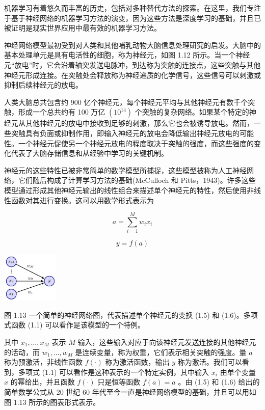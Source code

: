 \documentclass[10pt]{report}
\begin{document}
机器学习有着悠久而丰富的历史，包括对多种替代方法的探索。在这里，我们专注于基于神经网络的机器学习方法的演变，因为这些方法是深度学习的基础，并且已被证明是现实世界应用中最有效的机器学习方法。

神经网络模型最初受到对人类和其他哺乳动物大脑信息处理研究的启发。大脑中的基本处理单元是具有电活性的细胞，称为神经元，如图 1.12 所示。当一个神经元“放电”时，它会沿着轴突发送电脉冲，到达称为突触的连接点，这些突触与其他神经元形成连接。在突触处会释放称为神经递质的化学信号，这些信号可以刺激或抑制后续神经元的放电。

人类大脑总共包含约 900 亿个神经元，每个神经元平均与其他神经元有数千个突触，形成一个总共约有 100 万亿 \(\left( {10}^{14}\right)\) 个突触的复杂网络。如果某个特定的神经元从其他神经元的放电中接收到足够的刺激，那么它也会被诱导放电。然而，一些突触具有负面或抑制作用，即输入神经元的放电会降低输出神经元放电的可能性。一个神经元促使另一个神经元放电的程度取决于突触的强度，而这些强度的变化代表了大脑存储信息和从经验中学习的关键机制。

神经元的这些特性已被非常简单的数学模型所捕捉，这些模型被称为人工神经网络，它们随后构成了计算学习方法的基础(McCulloch 和 Pitts，1943)。许多这些模型通过形成其他神经元输出的线性组合来描述单个神经元的特性，然后使用非线性函数对其进行变换。这可以用数学形式表示为

\[
a = \mathop{\sum }\limits_{{i = 1}}^{M}{w}_{i}{x}_{i} \tag{1.5}
\]

\[
y = f\left( a\right)  \tag{1.6}
\]

\begin{center}
\includegraphics[max width=0.2\textwidth]{images/0194e279-9b28-703a-88f4-c3ac21e2010d_36_1225_345_326_291_0.jpg}
\end{center}
\hspace*{3em} 

图 1.13 一个简单的神经网络图，代表描述单个神经元的变换 (1.5) 和 (1.6)。多项式函数 (1.1) 可以看作是该模型的一个特例。

其中 \({x}_{1},\ldots ,{x}_{M}\) 表示 \(M\) 输入，这些输入对应于向该神经元发送连接的其他神经元的活动，而 \({w}_{1},\ldots ,{w}_{M}\) 是连续变量，称为权重，它们表示相关突触的强度。量 \(a\) 称为预激活，非线性函数 \(f\left( \cdot \right)\) 称为激活函数，输出 \(y\) 称为激活。我们可以看到，多项式 (1.1) 可以看作是这种表示的一个特定实例，其中输入 \({x}_{i}\) 由单个变量 \(x\) 的幂给出，并且函数 \(f\left( \cdot \right)\) 只是恒等函数 \(f\left( a\right)  = a\) 。由 (1.5) 和 (1.6) 给出的简单数学公式从 20 世纪 60 年代至今一直是神经网络模型的基础，并且可以用如图 1.13 所示的图表形式表示。
\end{document}
